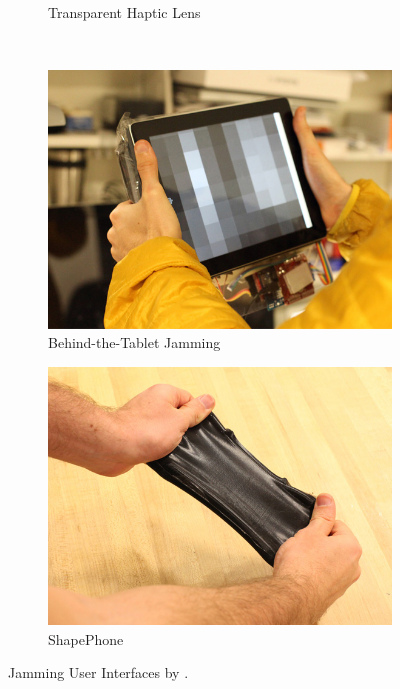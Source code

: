 \begin{figure}
\begin{subfigure}[b]{0.4\textwidth}
                \caption{Transparent Haptic Lens}
                \label{fig:ch:jamming:jui-lens}
        \end{subfigure}
        ~ %
        \begin{subfigure}[b]{0.4\textwidth}
                \centering
                \includegraphics[width=\textwidth]{figures/jamming/jui_behind-the-tablet}
                \caption{Behind-the-Tablet Jamming}
                \label{fig:ch:jamming:jui-tablet}
        \end{subfigure}
        \begin{subfigure}[b]{0.4\textwidth}
                \centering
                \includegraphics[width=\textwidth]{figures/jamming/jui_shapephone}
                \caption{ShapePhone}
                \label{fig:ch:jamming:jui-phone}
        \end{subfigure}
        \caption{Jamming User Interfaces by \citet{follmer2012jamming}.}
        \label{fig:ch:jamming:jui-collection}
\end{figure}
